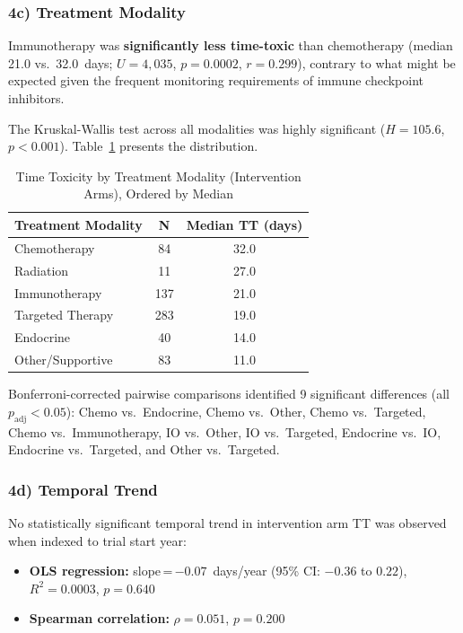 \documentclass[11pt,a4paper]{article}
\begin{document}
\subsubsection{4c) Treatment Modality}

Immunotherapy was \textbf{significantly less time-toxic} than chemotherapy (median 21.0 vs.\ 32.0~days; $U=4{,}035$, $p=0.0002$, $r=0.299$), contrary to what might be expected given the frequent monitoring requirements of immune checkpoint inhibitors.

The Kruskal-Wallis test across all modalities was highly significant ($H=105.6$, $p<0.001$). Table~\ref{tab:modality} presents the distribution.

\begin{table}[H]
\centering
\caption{Time Toxicity by Treatment Modality (Intervention Arms), Ordered by Median}
\label{tab:modality}
\begin{tabular}{lcc}
\toprule
\textbf{Treatment Modality} & \textbf{N} & \textbf{Median TT (days)} \\
\midrule
Chemotherapy & 84 & 32.0 \\
Radiation & 11 & 27.0 \\
Immunotherapy & 137 & 21.0 \\
Targeted Therapy & 283 & 19.0 \\
Endocrine & 40 & 14.0 \\
Other/Supportive & 83 & 11.0 \\
\bottomrule
\end{tabular}
\end{table}

Bonferroni-corrected pairwise comparisons identified 9 significant differences (all $p_{\text{adj}}<0.05$): Chemo vs.\ Endocrine, Chemo vs.\ Other, Chemo vs.\ Targeted, Chemo vs.\ Immunotherapy, IO vs.\ Other, IO vs.\ Targeted, Endocrine vs.\ IO, Endocrine vs.\ Targeted, and Other vs.\ Targeted.

\subsubsection{4d) Temporal Trend}

No statistically significant temporal trend in intervention arm TT was observed when indexed to trial start year:
\begin{itemize}
    \item \textbf{OLS regression:} slope\,=\,$-0.07$~days/year (95\% CI: $-0.36$ to $0.22$), $R^2=0.0003$, $p=0.640$
    \item \textbf{Spearman correlation:} $\rho=0.051$, $p=0.200$
\end{itemize}
\end{document}
